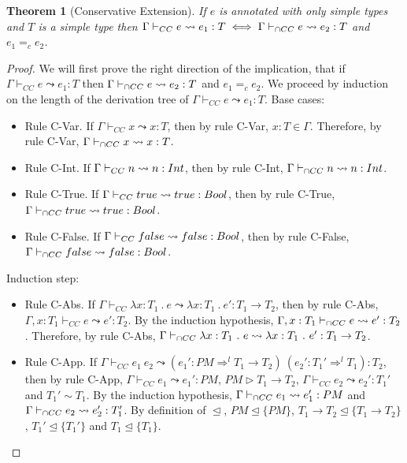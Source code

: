 \documentclass[a4paper]{article}
\newtheorem{theorem}{Theorem}[section]
\begin{document}
\begin{theorem}[Conservative Extension]
\label{conservative_extension_intersection_cast_insertion}
If $e$ is annotated with only simple types and $T$ is a simple type then $\Gamma \vdash_{CC} e \leadsto e_1 : T \iff \Gamma \vdash_{\cap CC} e \leadsto e_2 : T$ and $e_1 =_{c} e_2$.
\end{theorem}
\begin{proof}
We will first prove the right direction of the implication, that if $\Gamma \vdash_{CC} e \leadsto e_1 : T$ then $\Gamma \vdash_{\cap CC} e \leadsto e_2 : T$ and $e_1 =_{c} e_2$.
We proceed by induction on the length of the derivation tree of $\Gamma \vdash_{CC} e \leadsto e_1 : T$.
Base cases:
\begin{itemize}
    \item Rule C-Var.
    If $\Gamma \vdash_{CC} x \leadsto x : T$, then by rule C-Var, $x : T \in \Gamma$.
    Therefore, by rule C-Var, $\Gamma \vdash_{\cap CC} x \leadsto x : T$.
    \item Rule C-Int.
    If $\Gamma \vdash_{CC} n \leadsto n : {Int}$, then by rule C-Int, $\Gamma \vdash_{\cap CC} n \leadsto n : {Int}$.
    \item Rule C-True.
    If $\Gamma \vdash_{CC} true \leadsto true : Bool$, then by rule C-True, $\Gamma \vdash_{\cap CC} true \leadsto true : Bool$.
    \item Rule C-False.
    If $\Gamma \vdash_{CC} false \leadsto false : Bool$, then by rule C-False, $\Gamma \vdash_{\cap CC} false \leadsto false : Bool$.
\end{itemize}
Induction step:
\begin{itemize}
    \item Rule C-Abs.
    If $\Gamma \vdash_{CC} \lambda x : T_1\ .\ e \leadsto \lambda x : T_1\ .\ e' : T_1 \rightarrow T_2$, then by rule C-Abs, $\Gamma, x : T_1 \vdash_{CC} e \leadsto e' : T_2$.
    By the induction hypothesis, $\Gamma, x : T_1 \vdash_{\cap CC} e \leadsto e' : T_2$.
    Therefore, by rule C-Abs, $\Gamma \vdash_{\cap CC} \lambda x : T_1\ .\ e \leadsto \lambda x : T_1\ .\ e' : T_1 \rightarrow T_2$.
    \item Rule C-App.
    If $\Gamma \vdash_{CC} e_1\ e_2 \leadsto (e_1' : PM \Rightarrow^l T_1 \rightarrow T_2)\ (e_2' : T_1' \Rightarrow^l T_1) : T_2$, then by rule C-App, $\Gamma \vdash_{CC} e_1 \leadsto e_1' : PM$, $PM \rhd T_1 \rightarrow T_2$, $\Gamma \vdash_{CC} e_2 \leadsto e_2' : T_1'$ and $T_1' \sim T_1$.
    By the induction hypothesis, $\Gamma \vdash_{\cap CC} e_1 \leadsto e_1' : PM$ and $\Gamma \vdash_{\cap CC} e_2 \leadsto e_2' : T_1'$.
    By definition of $\trianglelefteq$, $PM \trianglelefteq \{PM\}$, $T_1 \rightarrow T_2 \trianglelefteq \{T_1 \rightarrow T_2\}$, $T_1' \trianglelefteq \{T_1'\}$ and $T_1 \trianglelefteq \{T_1\}$.

\end{itemize}
\end{proof}
\end{document}
